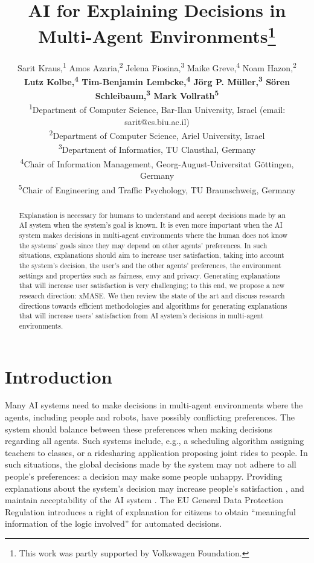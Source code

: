 \documentclass[letterpaper]{article} %
\title{AI for Explaining Decisions in Multi-Agent Environments\thanks{This work was partly supported by Volkswagen Foundation.}}
\author{Sarit Kraus,\textsuperscript{\rm 1} Amos Azaria,\textsuperscript{\rm 2} Jelena Fiosina,\textsuperscript{\rm 3} Maike Greve,\textsuperscript{\rm 4} Noam Hazon,\textsuperscript{\rm 2}\\ 
\Large{\textbf{Lutz Kolbe,\textsuperscript{\rm 4} Tim-Benjamin Lembcke,\textsuperscript{\rm 4} Jörg P. Müller,\textsuperscript{\rm 3} Sören Schleibaum,\textsuperscript{\rm 3} Mark Vollrath\textsuperscript{\rm 5}}} \\ 
\textsuperscript{1}{Department of Computer Science, Bar-Ilan University, Israel} (email: sarit@cs.biu.ac.il)\\
\textsuperscript{2}{Department of Computer Science, Ariel University, Israel} \\
\textsuperscript{3}{Department of Informatics, TU Clausthal, Germany} \\
\textsuperscript{4}{Chair of Information Management, Georg-August-Universitat Göttingen, Germany} \\
\textsuperscript{5}{Chair of Engineering and Traffic Psychology, TU Braunschweig, Germany}
}
\begin{document}
\maketitle

\begin{abstract}
Explanation is necessary for humans to understand and accept decisions made by an AI system when the system's goal is known. It is even more important when the AI system makes decisions in multi-agent environments where the human does not know the systems' goals since they may depend on other agents' preferences. In such situations, explanations should aim to increase user satisfaction, taking into account the system's decision, the user's and the other agents' preferences, the environment settings and properties such as fairness, envy and privacy.
Generating explanations that will increase user satisfaction is very challenging; to this end, we propose a new research direction: \ac{xMASE}.  We then review the state of the art and discuss research directions towards efficient methodologies and algorithms for generating explanations that will increase users' satisfaction from AI system's decisions in multi-agent environments. 
\end{abstract}


\section{Introduction}

Many AI systems need to make decisions in multi-agent environments where the agents, including people and robots, have possibly conflicting preferences. The system should balance between these preferences when making decisions regarding all agents. Such systems include, e.g., a scheduling algorithm assigning teachers to classes, or a ridesharing application proposing joint rides to people. %
In such situations, the global decisions made by the system may not adhere to all people's preferences: a decision may make some people unhappy. Providing explanations about the system's decision may increase people's satisfaction \cite{bradley2009dealing}, and maintain acceptability of the AI system . The EU General Data Protection Regulation introduces a right of explanation \cite{Goodman2016} for citizens to obtain “meaningful information of the logic involved” for automated decisions.
\end{document}
